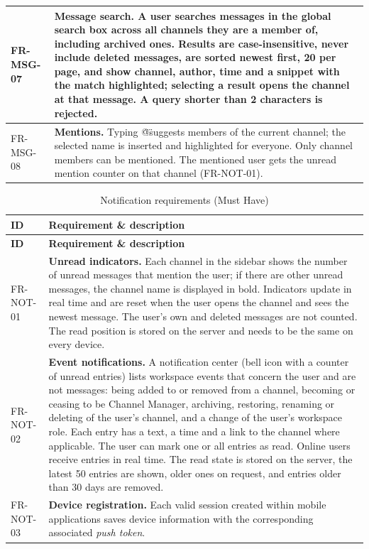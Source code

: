\documentclass[
    english, %
]{VUMIFPSkursinis}
\newcommand{\frhead}{\textbf{ID} & \textbf{Requirement \& description} \\ \hline}
\begin{document}
\begin{longtable}{|p{}|p{}|}
FR-MSG-07 & \textbf{Message search.} A user searches messages in the global search box across all channels they are a member of, including archived ones. Results are case-insensitive, never include deleted messages, are sorted newest first, 20 per page, and show channel, author, time and a snippet with the match highlighted; selecting a result opens the channel at that message. A query shorter than 2 characters is rejected. \\ \hline
FR-MSG-08 & \textbf{Mentions.} Typing \"@\" suggests members of the current channel; the selected name is inserted and highlighted for everyone. Only channel members can be mentioned. The mentioned user gets the unread mention counter on that channel (FR-NOT-01). \\ \hline
\end{longtable}



\begin{longtable}{|p{}|p{}|}
\caption{Notification requirements (Must Have)}\\ \hline
\frhead
\endfirsthead
\hline \frhead
\endhead
FR-NOT-01 & \textbf{Unread indicators.} Each channel in the sidebar shows the number of unread messages that mention the user; if there are other unread messages, the channel name is displayed in bold. Indicators update in real time and are reset when the user opens the channel and sees the newest message. The user's own and deleted messages are not counted. The read position is stored on the server and needs to be the same on every device. \\ \hline
FR-NOT-02 & \textbf{Event notifications.} A notification center (bell icon with a counter of unread entries) lists workspace events that concern the user and are not messages: being added to or removed from a channel, becoming or ceasing to be Channel Manager, archiving, restoring, renaming or deleting of the user's channel, and a change of the user's workspace role. Each entry has a text, a time and a link to the channel where applicable. The user can mark one or all entries as read. Online users receive entries in real time. The read state is stored on the server, the latest 50 entries are shown, older ones on request, and entries older than 30 days are removed. \\ \hline
FR-NOT-03 & \textbf{Device registration.} Each valid session created within mobile applications saves device information with the corresponding associated \textit{push token}. \\ \hline
\end{longtable}
\end{document}
